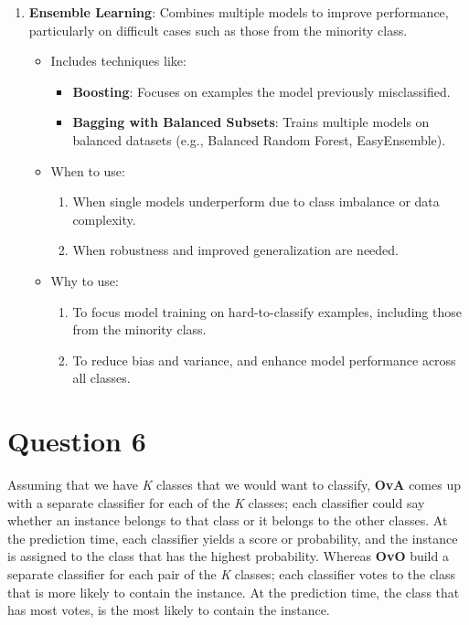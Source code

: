 \documentclass[a4paper,12pt]{article}
\begin{document}
\begin{enumerate}
    \item \textbf{Ensemble Learning}: Combines multiple models to improve performance, particularly on difficult cases such as those from the minority class.
    \begin{itemize}
        \item Includes techniques like:
        \begin{itemize}
            \item \textbf{Boosting}: Focuses on examples the model previously misclassified.
            \item \textbf{Bagging with Balanced Subsets}: Trains multiple models on balanced datasets (e.g., Balanced Random Forest, EasyEnsemble).
        \end{itemize}
        \item When to use:
        \begin{enumerate}
            \item When single models underperform due to class imbalance or data complexity.
            \item When robustness and improved generalization are needed.
        \end{enumerate}
        \item Why to use:
        \begin{enumerate}
            \item To focus model training on hard-to-classify examples, including those from the minority class.
            \item To reduce bias and variance, and enhance model performance across all classes.
        \end{enumerate}
    \end{itemize}
\end{enumerate}

\section*{Question 6}
Assuming that we have \textit{K} classes that we would want to classify, \textbf{OvA} comes up with a separate classifier for each of the \textit{K} classes; each classifier could say whether an instance
belongs to that class or it belongs to the other classes. At the prediction time, each classifier yields a score or probability, and the instance is assigned to the class that has the highest probability.
Whereas \textbf{OvO} build a separate classifier for each pair of the \textit{K} classes; each classifier votes to the class that is more likely to contain the instance. At the prediction time, the class 
that has most votes, is the most likely to contain the instance.
\end{document}

